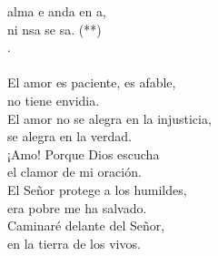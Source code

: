 \begin{cancion}%
	alma e anda en a,\\
	ni nsa  se sa. (**)\\
	.     \\
	\jump\\
El amor es paciente, es afable, \\
no tiene envidia.\\
El amor no se alegra en la injusticia, \\
se alegra en la verdad.\\
¡Amo! Porque Dios escucha \\
el clamor de mi oración. \\
El Señor protege a los humildes, \\
era pobre me ha salvado. \\
Caminaré delante del Señor, \\
en la tierra de los vivos.\\
\end{cancion}%
